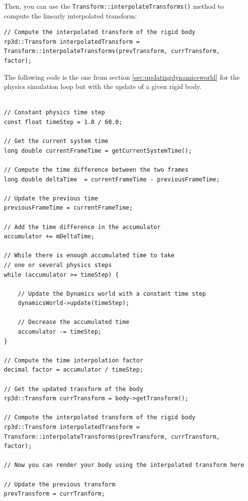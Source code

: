 \documentclass[a4paper,12pt]{article}
\begin{document}
    Then, you can use the \texttt{Transform::interpolateTransforms()} method to compute the linearly interpolated transform:  \\

    \begin{lstlisting}
// Compute the interpolated transform of the rigid body
rp3d::Transform interpolatedTransform = Transform::interpolateTransforms(prevTransform, currTransform, factor);
  \end{lstlisting}

    \vspace{0.6cm}

    The following code is the one from section \ref{sec:updatingdynamicsworld} for the physics simulation loop but with the update of a given rigid body. \\
    
    \begin{lstlisting}

// Constant physics time step
const float timeStep = 1.0 / 60.0;

// Get the current system time
long double currentFrameTime = getCurrentSystemTime();

// Compute the time difference between the two frames
long double deltaTime  = currentFrameTime - previousFrameTime;

// Update the previous time
previousFrameTime = currentFrameTime;

// Add the time difference in the accumulator
accumulator += mDeltaTime;

// While there is enough accumulated time to take
// one or several physics steps
while (accumulator >= timeStep) {

    // Update the Dynamics world with a constant time step
    dynamicsWorld->update(timeStep);

    // Decrease the accumulated time
    accumulator -= timeStep;
}

// Compute the time interpolation factor
decimal factor = accumulator / timeStep;

// Get the updated transform of the body
rp3d::Transform currTransform = body->getTransform();

// Compute the interpolated transform of the rigid body
rp3d::Transform interpolatedTransform = Transform::interpolateTransforms(prevTransform, currTransform, factor);

// Now you can render your body using the interpolated transform here

// Update the previous transform
prevTransform = currTranform;

    \end{lstlisting}
\end{document}
